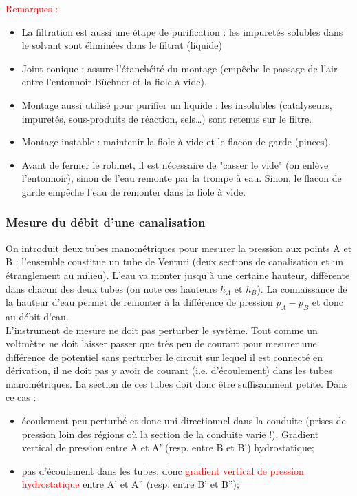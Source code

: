 \documentclass[11pt,a4paper]{report}
\begin{document}
\textcolor{red}{Remarques :}
\begin{itemize}
	\item La filtration est aussi une étape de purification : les impuretés solubles dans le solvant sont éliminées dans le filtrat (liquide)
	\item Joint conique : assure l'étanchéité du montage (empêche le passage de l'air entre l'entonnoir Büchner et la fiole à vide).
	\item Montage aussi utilisé pour purifier un liquide : les insolubles (catalyseurs, impuretés, sous-produits de réaction, sels…) sont retenus sur le filtre.
	\item Montage instable : maintenir la fiole à vide et le flacon de garde (pinces). 
	\item Avant de fermer le robinet, il est nécessaire de "casser le vide" (on enlève l'entonnoir), sinon de l'eau remonte par la trompe à eau. 
	Sinon, le flacon de garde empêche l'eau de remonter dans la fiole à vide.
\end{itemize}

\subsubsection{Mesure du débit d'une canalisation}
	
	On introduit deux tubes manométriques pour mesurer la pression aux points A et B : l'ensemble constitue un tube de Venturi (deux sections de canalisation et un étranglement au milieu). L'eau va monter jusqu'à une certaine hauteur, différente dans chacun des deux tubes (on note ces hauteurs $h_A$ et $h_B$). La connaissance de la hauteur d'eau permet de remonter à la différence de pression $p_A - p_B$ et donc au débit d'eau.\\	
	
	L'instrument de mesure ne doit pas perturber le système. Tout comme un voltmètre ne doit laisser passer que très peu de courant pour mesurer une différence de potentiel sans perturber le circuit sur lequel il est connecté en dérivation, il ne doit pas y avoir de courant (i.e. d'écoulement) dans les tubes manométriques. La section de ces tubes doit donc être suffisamment petite. Dans ce cas :
	\begin{itemize}
		\item écoulement peu perturbé et donc uni-directionnel dans la conduite (prises de pression loin des régions où la section de la conduite varie !). 
		Gradient vertical de pression entre A et A' (resp. entre B et B') hydrostatique;
		\item pas d'écoulement dans les tubes, donc \textcolor{red}{gradient vertical de pression hydrostatique} entre A' et A'' (resp. entre B' et B'');\\
	\end{itemize}
\end{document}
